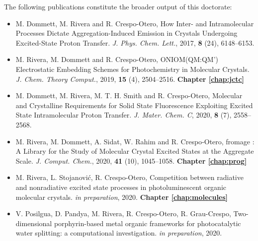 The following publications constitute the broader output of this doctorate:
\begin{itemize}
    \item M. Dommett, M. Rivera and R. Crespo-Otero, How Inter- and Intramolecular Processes Dictate Aggregation-Induced Emission in Crystals Undergoing Excited-State Proton Transfer. \textit{J. Phys. Chem. Lett.}, 2017, \textbf{8} (24), 6148–6153.
    \item M. Rivera, M. Dommett and R. Crespo-Otero, ONIOM(QM:QM') Electrostatic Embedding Schemes for Photochemistry in Molecular Crystals. \textit{J. Chem. Theory Comput.}, 2019, \textbf{15} (4), 2504–2516. \hbox{}\hfill \textbf{Chapter \ref{chap:jctc}}
    \item M. Dommett, M. Rivera, M. T. H. Smith and R. Crespo-Otero, Molecular and Crystalline Requirements for Solid State Fluorescence Exploiting Excited State Intramolecular Proton Transfer. \textit{J. Mater. Chem. C}, 2020, \textbf{8} (7), 2558–2568.
    \item M. Rivera, M. Dommett, A. Sidat, W. Rahim and R. Crespo‐Otero, fromage : A Library for the Study of Molecular Crystal Excited States at the Aggregate Scale. \textit{J. Comput. Chem.}, 2020, \textbf{41} (10), 1045–1058. \hfill \textbf{Chapter \ref{chap:prog}}
    \item M. Rivera, L. Stojanovi\'c, R. Crespo-Otero, Competition between radiative and nonradiative excited state processes in photoluminescent organic molecular crystals. \textit{in preparation}, 2020. \hfill \textbf{Chapter \ref{chap:molecules}}
    \item V. Posilgua, D. Pandya, M. Rivera, R. Crespo-Otero, R. Grau-Crespo, Two-dimensional porphyrin-based metal organic frameworks for photocatalytic water splitting: a computational investigation. \textit{in preparation}, 2020.
\end{itemize}



